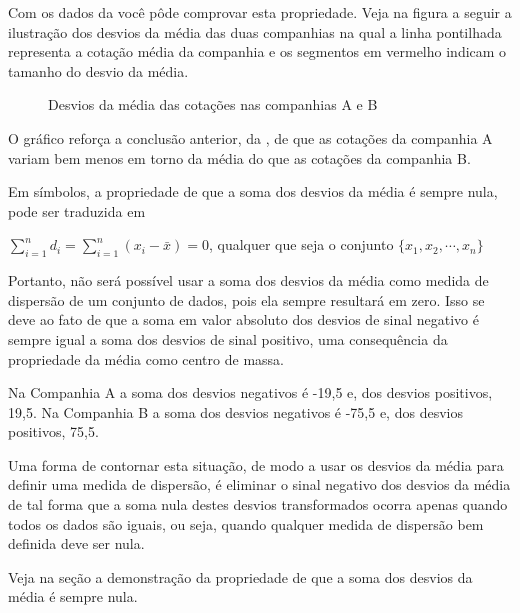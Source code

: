 Com os dados da  você pôde comprovar esta propriedade. Veja na figura a seguir a ilustração dos desvios da média das duas companhias na qual a linha pontilhada representa a cotação média da companhia e os segmentos em vermelho indicam o tamanho do desvio da média.

\begin{figure}[H]
\centering
\capstart

\noindent{}
\caption{Desvios da média das cotações nas companhias A e B}\label{\detokenize{PE104-4:fig-desvios-da-media}}\label{\detokenize{PE104-4:id3}}\end{figure}

O gráfico {\hyperref[\detokenize{PE104-4:fig-desvios-da-media}]{}} reforça a conclusão anterior, da , de que as cotações da companhia A variam bem menos em torno da média do que as cotações da companhia B.

Em símbolos, a propriedade de que a soma dos desvios da média é sempre nula, pode ser traduzida em

\(\displaystyle{\sum^n_{i=1}} d_i=\displaystyle{\sum^n_{i=1}} (x_i-\bar{x})=0\), qualquer que seja o conjunto \(\{ x_1,x_2,\cdots, x_n\}\)

Portanto, não será possível usar a soma dos desvios da média como medida de dispersão de um conjunto de dados, pois ela sempre resultará em zero. Isso se deve ao fato de que a soma em valor absoluto dos desvios de sinal negativo é sempre igual a soma dos desvios de sinal positivo, uma consequência da propriedade da média como centro de massa.

Na Companhia A a soma dos desvios negativos é -19,5 e, dos desvios positivos, 19,5. Na Companhia B a soma dos desvios negativos é -75,5 e, dos desvios positivos, 75,5.

Uma forma de  contornar esta situação, de modo a usar os desvios da média para definir uma medida de dispersão, é eliminar o sinal negativo dos desvios da média de tal forma que a soma nula destes desvios transformados ocorra apenas quando todos os dados são iguais, ou seja, quando qualquer medida de dispersão bem definida deve ser nula.

Veja na seção {\hyperref[\detokenize{PE104-A:sec-para-saber-mais}]{}} a demonstração da propriedade de que a soma dos desvios da média é sempre nula.

